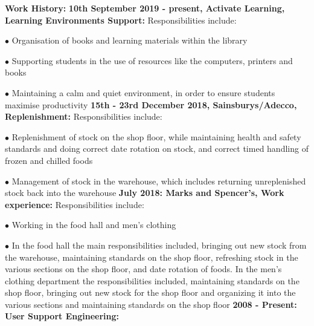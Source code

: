 \documentclass[10pt,a4paper]{book}
\begin{document}
\begin{flushleft}
  \textbf {Work History:}
  \linebreak{}
  \linebreak{}
  \textbf {10th September 2019 - present, Activate Learning, Learning Environments Support:}
  \linebreak{}
  Responsibilities include:

\item[$\bullet$] Organisation of books and learning materials within the library

\item[$\bullet$] Supporting students in the use of resources like the computers, printers and books

\item[$\bullet$] Maintaining a calm and quiet environment, in order to ensure students maximise productivity
  \linebreak{}
  \linebreak{}
\textbf {15th - 23rd December 2018, Sainsburys/Adecco, Replenishment:}
  \linebreak{}
  Responsibilities include:

\item[$\bullet$] Replenishment of stock on the shop floor, while maintaining health and safety standards and doing correct date rotation on stock, and correct timed handling of frozen and chilled foods

\item[$\bullet$] Management of stock in the warehouse, which includes returning unreplenished stock back into the warehouse
  \linebreak{}
  \linebreak{}
\textbf {July 2018: Marks and Spencer's, Work experience:}
  \linebreak{}
Responsibilities include:

  \item[$\bullet$] Working in the food hall and men's clothing

  \item[$\bullet$] In the food hall the main responsibilities included, bringing out new stock from the warehouse, maintaining standards on the shop floor, refreshing stock in the various sections on the shop floor, and date rotation of foods. In the men's clothing department the responsibilities included, maintaining standards on the shop floor, bringing out new stock for the shop floor and organizing it into the various sections and maintaining standards on the shop floor
    \linebreak{}
    \linebreak{}
  \textbf {2008 - Present: User Support Engineering:} 


\end{flushleft}
\end{document}
